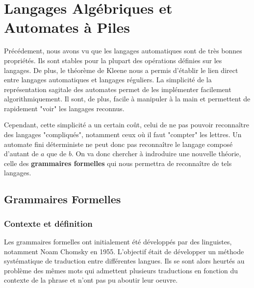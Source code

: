 \chapter{Langages Algébriques et Automates à Piles}

\minitoc %

\setlength{\parindent}{0pt}
\renewcommand{\labelitemi}{\textbullet} %


Précédement, nous avons vu que les langages automatiques sont de très bonnes propriétés. Ils sont stables 
pour la plupart des opérations définies sur les langages. De plus, le théorème de Kleene nous a permis d'établir 
le lien direct entre langages automatiques et langages réguliers. 
La simplicité de la représentation sagitale des automates permet de les implémenter facilement algorithmiquement. 
Il sont, de plus, facile à manipuler à la main et permettent de rapidement "voir" les langages reconnus. 

Cependant, cette simplicité a un certain coût, celui de ne pas pouvoir reconnaître des langages "compliqués", notamment
ceux où il faut "compter" les lettres. Un automate fini déterministe ne peut donc pas reconnaître le langage composé 
d'autant de $a$ que de $b$. 
On va donc chercher à indroduire une nouvelle théorie, celle des \textbf{grammaires formelles} qui nous permettra
de reconnaître de tels langages. 



\section{Grammaires Formelles}

\subsection{Contexte et définition}

Les grammaires formelles ont initialement été développés par des linguistes, notamment Noam Chomsky en 1955. 
L'objectif était de développer un méthode systématique de traduction entre différentes langues. 
Ils se sont alors heurtés au problème des mêmes mots qui admettent plusieurs traductions en fonction du contexte de la 
phrase et n'ont pas pu aboutir leur oeuvre. 

